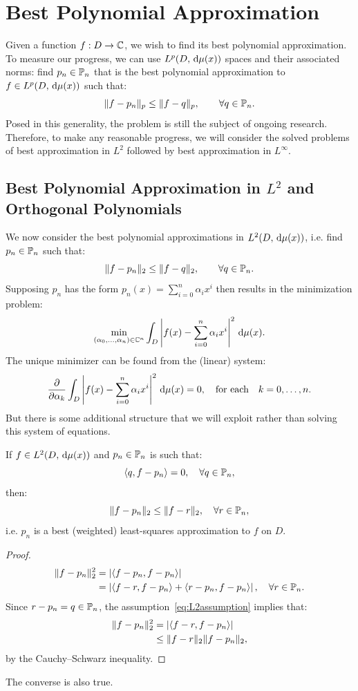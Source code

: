 \section{Best Polynomial Approximation}

Given a function $f:D\to\C$, we wish to find its best polynomial approximation. To measure our progress, we can use $L^p(D,\ud\mu(x))$ spaces and their associated norms: find $p_n\in\P_n$ that is the best polynomial approximation to $f\in L^p(D,\ud\mu(x))$ such that:
\[
\|f-p_n\|_p \le \|f-q\|_p,\qquad\forall q\in\P_n.
\]
Posed in this generality, the problem is still the subject of ongoing research. Therefore, to make any reasonable progress, we will consider the solved problems of best approximation in $L^2$ followed by best approximation in $L^\infty$.

\subsection{Best Polynomial Approximation in $L^2$ and Orthogonal Polynomials}

We now consider the best polynomial approximations in $L^2(D,\ud\mu(x))$, i.e. find $p_n\in\P_n$ such that:
\[
\|f-p_n\|_2 \le \|f-q\|_2,\qquad\forall q\in\P_n.
\]
Supposing $p_n$ has the form $p_n(x) = \sum_{i=0}^n \alpha_i x^i$ then results in the minimization problem:
\[
\min_{(\alpha_0,\ldots,\alpha_n)\in\C^n} \int_D \abs{f(x)-\sum_{i=0}^n \alpha_i x^i}^2\ud\mu(x).
\]
The unique minimizer can be found from the (linear) system:
\[
\dfrac{\partial}{\partial\alpha_k}\int_D \abs{f(x)-\sum_{i=0}^n \alpha_i x^i}^2\ud\mu(x) = 0,\quad\hbox{for each}\quad k=0,\ldots,n.
\]
But there is some additional structure that we will exploit rather than solving this system of equations.

\begin{theorem}
If $f\in L^2(D,\ud\mu(x))$ and $p_n\in\P_n$ is such that:
\begin{equation}\label{eq:L2assumption}
\langle q,f-p_n\rangle = 0,\quad \forall q\in\P_n,
\end{equation}
then:
\begin{equation}
\|f-p_n\|_2 \le \|f-r\|_2,\quad \forall r\in\P_n,
\end{equation}
i.e. $p_n$ is a best (weighted) least-squares approximation to $f$ on $D$.
\end{theorem}
\begin{proof}
\begin{align*}
\|f-p_n\|_2^2 & = \abs{\langle f-p_n,f-p_n\rangle}\\
& = \abs{\langle f-r,f-p_n\rangle + \langle r-p_n,f-p_n\rangle},\quad \forall r\in\P_n.
\end{align*}
Since $r-p_n=q\in\P_n$, the assumption~\eqref{eq:L2assumption} implies that:
\begin{align*}
\|f-p_n\|_2^2 & = \abs{\langle f-r,f-p_n\rangle}\\
& \le \|f-r\|_2\|f-p_n\|_2,
\end{align*}
by the Cauchy--Schwarz inequality.
\end{proof}
\begin{remark}
The converse is also true.
\end{remark}

